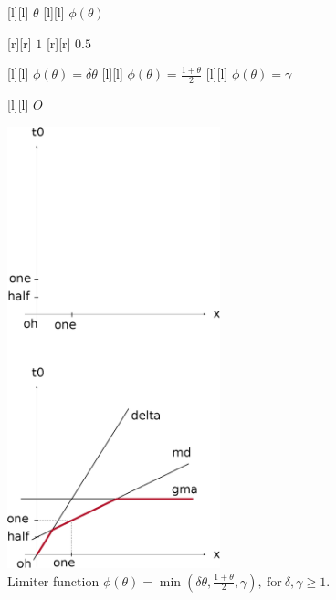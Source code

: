 \begin{figure}[ht]
	\centering
	\footnotesize

	[l] {$\theta$}
	[l] {$\phi(\theta)$}

	[r] {$1$}
	[r] {$0.5$}

	[l] {$\phi(\theta) = \delta \theta$}
	[l] {$\displaystyle \phi(\theta) = \frac{1+\theta}{2}$}
	[l] {$\phi(\theta) = \gamma$}

	[l] {$O$}

	\includegraphics[width=0.55\textwidth]{limiter1.eps}
	\caption{Limiter function
		$\displaystyle \phi(\theta) =
			\min\left(\delta \theta, \frac{1+\theta}{2}, \gamma \right),
			\ \text{for} \ \delta,\gamma \geq 1$.}
	\label{\LABEL}
\end{figure}